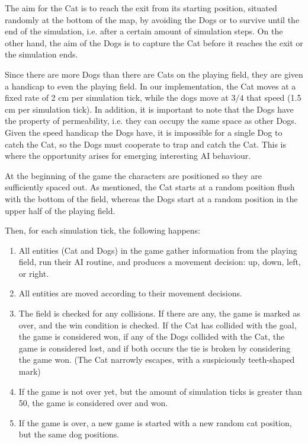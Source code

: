 The aim for the Cat is to reach the exit from its starting position, situated
randomly at the bottom of the map, by avoiding the Dogs or to survive until the
end of the simulation, i.e. after a certain amount of simulation steps. On the
other hand, the aim of the Dogs is to capture the Cat before it reaches the exit
or the simulation ends.

Since there are more Dogs than there are Cats on the playing field, they are
given a handicap to even the playing field. In our implementation, the Cat moves
at a fixed rate of 2 cm per simulation tick, while the dogs move at $3/4$ that
speed (1.5 cm per simulation tick). In addition, it is important to note that
the Dogs have the property of permeability, i.e. they can occupy the same space
as other Dogs. Given the speed handicap the Dogs have, it is impossible for a
single Dog to catch the Cat, so the Dogs must cooperate to trap and catch the
Cat. This is where the opportunity arises for emerging interesting AI behaviour.

At the beginning of the game the characters are positioned so they are
sufficiently spaced out. As mentioned, the Cat starts at a random position flush
with the bottom of the field, whereas the Dogs start at a random position in the
upper half of the playing field.

Then, for each simulation tick, the following happens:

\begin{enumerate}
\item All entities (Cat and Dogs) in the game gather information from the
  playing field, run their AI routine, and produces a movement decision: up,
  down, left, or right.
\item All entities are moved according to their movement decisions.
\item The field is checked for any collisions. If there are any, the game is
  marked as over, and the win condition is checked. If the Cat has collided with
  the goal, the game is considered won, if any of the Dogs collided with the
  Cat, the game is considered lost, and if both occurs the tie is broken by
  considering the game won. (The Cat narrowly escapes, with a suspiciously
  teeth-shaped mark)
\item If the game is not over yet, but the amount of simulation ticks is greater
  than 50, the game is considered over and won.
\item If the game is over, a new game is started with a new random cat position,
  but the same dog positions. 
\end{enumerate}

